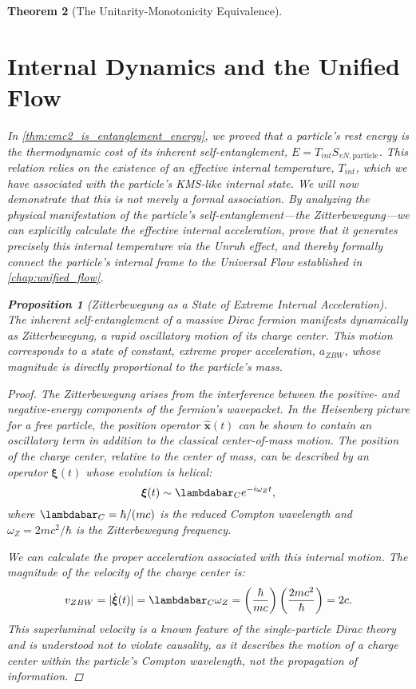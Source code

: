 \documentclass[11pt, letterpaper]{report}
\theoremstyle{plain} %
\newtheorem{theorem}{Theorem}[chapter]
\newtheorem{proposition}[theorem]{Proposition}
\theoremstyle{definition} %
\theoremstyle{remark} %
\begin{document}
\begin{theorem}[The Unitarity-Monotonicity Equivalence]
\section{Internal Dynamics and the Unified Flow}
\label{sec:internal_dynamics_unified_flow}

In \cref{thm:emc2_is_entanglement_energy}, we proved that a particle's rest energy is the thermodynamic cost of its inherent self-entanglement, $E = T_{int} S_{vN, \text{particle}}$. This relation relies on the existence of an effective internal temperature, $T_{int}$, which we have associated with the particle's KMS-like internal state. We will now demonstrate that this is not merely a formal association. By analyzing the physical manifestation of the particle's self-entanglement---the Zitterbewegung---we can explicitly calculate the effective internal acceleration, prove that it generates precisely this internal temperature via the Unruh effect, and thereby formally connect the particle's internal frame to the Universal Flow established in \cref{chap:unified_flow}.

\begin{proposition}[Zitterbewegung as a State of Extreme Internal Acceleration]
\label{prop:zbw_as_acceleration}
The inherent self-entanglement of a massive Dirac fermion manifests dynamically as Zitterbewegung, a rapid oscillatory motion of its charge center. This motion corresponds to a state of constant, extreme proper acceleration, $a_{ZBW}$, whose magnitude is directly proportional to the particle's mass.
\end{proposition}
\begin{proof}
The Zitterbewegung arises from the interference between the positive- and negative-energy components of the fermion's wavepacket. In the Heisenberg picture for a free particle, the position operator $\hat{\mathbf{x}}(t)$ can be shown to contain an oscillatory term in addition to the classical center-of-mass motion. The position of the charge center, relative to the center of mass, can be described by an operator $\boldsymbol{\xi}(t)$ whose evolution is helical:
\begin{equation}
    \boldsymbol{\xi}(t) \sim \lambdabar_C e^{-i \omega_Z t},
\end{equation}
where $\lambdabar_C = \hbar/(mc)$ is the reduced Compton wavelength and $\omega_Z = 2mc^2/\hbar$ is the Zitterbewegung frequency.

We can calculate the proper acceleration associated with this internal motion. The magnitude of the velocity of the charge center is:
\begin{equation}
    v_{ZBW} = |\dot{\boldsymbol{\xi}}(t)| = \lambdabar_C \omega_Z = \left(\frac{\hbar}{mc}\right) \left(\frac{2mc^2}{\hbar}\right) = 2c.
\end{equation}
This superluminal velocity is a known feature of the single-particle Dirac theory and is understood not to violate causality, as it describes the motion of a charge center within the particle's Compton wavelength, not the propagation of information.


\end{proof}
\end{theorem}
\end{document}
